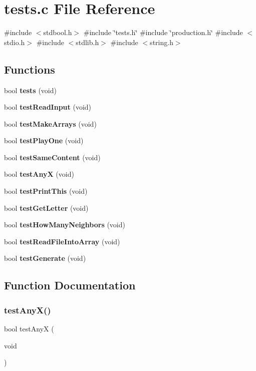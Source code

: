 \section{tests.\+c File Reference}
\label{tests_8c}
{\ttfamily \#include $<$stdbool.\+h$>$}\newline
{\ttfamily \#include \char`\"{}tests.\+h\char`\"{}}\newline
{\ttfamily \#include \char`\"{}production.\+h\char`\"{}}\newline
{\ttfamily \#include $<$stdio.\+h$>$}\newline
{\ttfamily \#include $<$stdlib.\+h$>$}\newline
{\ttfamily \#include $<$string.\+h$>$}\newline
\subsection*{Functions}
\begin{DoxyCompactItemize}
\item 
bool \textbf{ tests} (void)
\item 
bool \textbf{ test\+Read\+Input} (void)
\item 
bool \textbf{ test\+Make\+Arrays} (void)
\item 
bool \textbf{ test\+Play\+One} (void)
\item 
bool \textbf{ test\+Same\+Content} (void)
\item 
bool \textbf{ test\+AnyX} (void)
\item 
bool \textbf{ test\+Print\+This} (void)
\item 
bool \textbf{ test\+Get\+Letter} (void)
\item 
bool \textbf{ test\+How\+Many\+Neighbors} (void)
\item 
bool \textbf{ test\+Read\+File\+Into\+Array} (void)
\item 
bool \textbf{ test\+Generate} (void)
\end{DoxyCompactItemize}


\subsection{Function Documentation}
\mbox{\label{tests_8c_a9136792bde961164c06bcdde7ab1d5f5}} 
\subsubsection{test\+Any\+X()}
{\footnotesize\ttfamily bool test\+AnyX (\begin{DoxyParamCaption}\item[{void}]{ }\end{DoxyParamCaption})}



